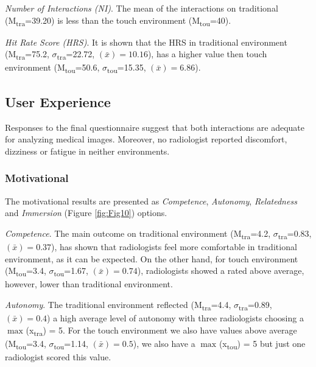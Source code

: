 \documentclass[sigchi-a, authorversion]{acmart}
\begin{document}
\textit{Number of Interactions (NI)}. The mean of the interactions on traditional (M\textsubscript{tra}=39.20) is less than the touch environment (M\textsubscript{tou}=40).

\textit{Hit Rate Score (HRS)}. It is shown that the HRS in traditional environment (M\textsubscript{tra}=75.2, $\sigma$\textsubscript{tra}=22.72, {}$\left({\bar x}\right)=10.16$), has a higher value then touch environment (M\textsubscript{tou}=50.6, $\sigma$\textsubscript{tou}=15.35, {}$\left({\bar x}\right)=6.86$).

\subsection{User Experience}

Responses to the final questionnaire suggest that both interactions are adequate for analyzing medical images. Moreover, no radiologist reported discomfort, dizziness or fatigue in neither environments.

\subsubsection{Motivational}

The motivational results are presented as \textit{Competence}, \textit{Autonomy}, \textit{Relatedness} and \textit{Immersion} (Figure \ref{fig:Fig10}) options.

\textit{Competence}. The main outcome on traditional environment (M\textsubscript{tra}=4.2, $\sigma$\textsubscript{tra}=0.83, {}$\left({\bar x}\right)=0.37$), has shown that radiologists feel more comfortable in traditional environment, as it can be expected. On the other hand, for touch environment (M\textsubscript{tou}=3.4, $\sigma$\textsubscript{tou}=1.67, {}$\left({\bar x}\right)=0.74$), radiologists showed a rated above average, however, lower than traditional environment.

\textit{Autonomy}. The traditional environment reflected (M\textsubscript{tra}=4.4, $\sigma$\textsubscript{tra}=0.89, {}$\left({\bar x}\right)=0.4$) a high average level of autonomy with three radiologists choosing a $\max_{}$(x\textsubscript{tra}) = 5. For the touch environment we also have values above average (M\textsubscript{tou}=3.4, $\sigma$\textsubscript{tou}=1.14, {}$\left({\bar x}\right)=0.5$), we also have a $\max_{}$(x\textsubscript{tou}) = 5 but just one radiologist scored this value.
\end{document}

